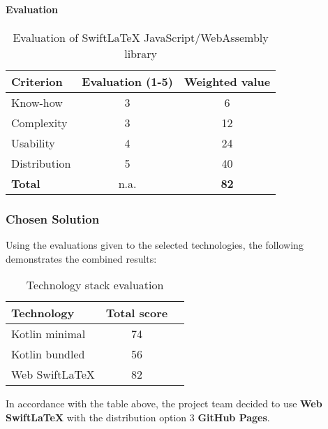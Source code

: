 \paragraph{Evaluation}\mbox{}\newline
\begin{table}[H]
    \centering
    \begin{tabular}{l c c}
        \toprule
        \textbf{Criterion} & \textbf{Evaluation (1{-}5)} & \textbf{Weighted value} \\
        \midrule
        Know-how           & 3                           & 6                       \\
        \midrule
        Complexity         & 3                           & 12                      \\
        \midrule
        Usability          & 4                           & 24                      \\
        \midrule
        Distribution       & 5                           & 40                      \\
        \midrule
        \textbf{Total}     & n.a.                        & \textbf{82}             \\
        \bottomrule
    \end{tabular}
    \caption{Evaluation of SwiftLaTeX JavaScript/WebAssembly library}\label{table:SwiftLaTeX_evaluation}
\end{table}

\subsubsection{Chosen Solution}
Using the evaluations given to the selected technologies, the following demonstrates the combined results:
\begin{table}[H]
    \centering
    \begin{tabular}{l c c}
        \toprule
        \textbf{Technology} & \textbf{Total score} \\
        \midrule
        Kotlin minimal      & 74                   \\
        \midrule
        Kotlin bundled      & 56                   \\
        \midrule
        Web SwiftLaTeX      & 82                   \\
        \bottomrule
    \end{tabular}
    \caption{Technology stack evaluation}\label{table:technology_evaluation}
\end{table}
In accordance with the table above, the project team decided to use \textbf{Web SwiftLaTeX} with the distribution option 3 \textbf{GitHub Pages}.

